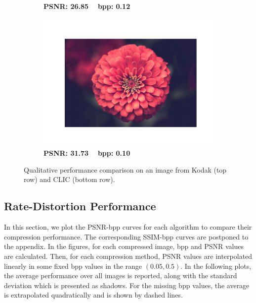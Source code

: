 \begin{figure}[t]
\begin{subfigure}{.23\textwidth}
        \vspace{-20pt}
        \caption*{\tiny \textbf{PSNR: 26.85 ~ bpp: 0.12}}
	\end{subfigure}
    \begin{subfigure}{.23\textwidth}
		\centering
		\includegraphics[trim=1.7cm 1.5cm 1.7cm 1.7cm, clip, width=1\textwidth]{figures/clic_flower_IMF - YCbCr_bpp_0.108.pdf}
        \vspace{-20pt}
        \caption*{\tiny \textbf{PSNR: 31.73 ~ bpp: 0.10}}
	\end{subfigure}

    \caption{Qualitative performance comparison on an image from Kodak (top row) and CLIC (bottom row).}
	\label{fig:qualitative_comparison}
\end{figure}



\subsection{Rate-Distortion Performance} \label{sec:rate_distortion_performance}
In this section, we plot the PSNR-bpp curves for each algorithm to compare their compression performance. The corresponding SSIM-bpp curves are postponed to the appendix.
In the figures, for each compressed image, bpp and PSNR values are calculated. Then, for each compression method, PSNR values are interpolated linearly in some fixed bpp values in the range $(0.05, 0.5)$. 
In the following plots, the average performance over all images is reported, along with the standard deviation which is presented as shadows.
For the missing bpp values, the average is extrapolated quadratically and is shown by dashed lines.

